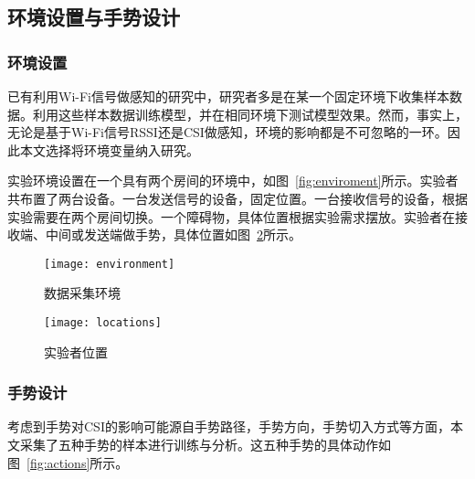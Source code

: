 \subsection{环境设置与手势设计}
\subsubsection{环境设置}

已有利用Wi-Fi信号做感知的研究中，研究者多是在某一个固定环境下收集样本数据。利用这些样本数据训练模型，并在相同环境下测试模型效果。然而，事实上，无论是基于Wi-Fi信号RSSI还是CSI做感知，环境的影响都是不可忽略的一环。因此本文选择将环境变量纳入研究。

实验环境设置在一个具有两个房间的环境中，如图~\ref{fig:enviroment}所示。实验者共布置了两台设备。一台发送信号的设备，固定位置。一台接收信号的设备，根据实验需要在两个房间切换。一个障碍物，具体位置根据实验需求摆放。实验者在接收端、中间或发送端做手势，具体位置如图~\ref{fig:locations}所示。

\begin{figure}[htbp] %
  \centering
  \texttt{[image: environment]}
  \caption{数据采集环境}
  \label{fig:environment}
\end{figure}

\begin{figure}[htbp] %
  \centering
  \texttt{[image: locations]}
  \caption{实验者位置}
  \label{fig:locations}
\end{figure}



\subsubsection{手势设计}

考虑到手势对CSI的影响可能源自手势路径，手势方向，手势切入方式等方面，本文采集了五种手势的样本进行训练与分析。这五种手势的具体动作如图~\ref{fig:actions}所示。

